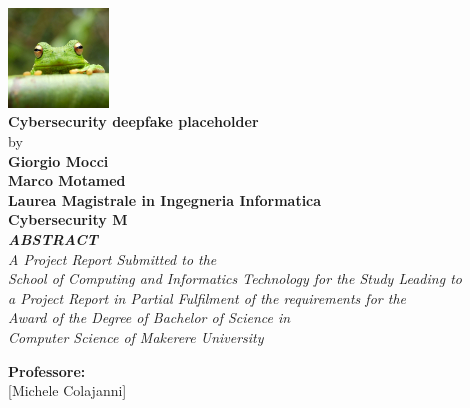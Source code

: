 \begin{titlepage}

\begin{center}

\includegraphics[width=0.2\textwidth]{frog.jpg}\\%
\vspace{3em}%
\Large \textbf {Cybersecurity deepfake placeholder}\\%
\vspace{1em}%
\normalsize by \\%
\vspace{1em}
\textup{\small {\bf Giorgio Mocci \\ Marco Motamed}\\}
 \vspace{1em}%
{\bf Laurea Magistrale in Ingegneria Informatica \\ Cybersecurity M}\\[0.5in]

\emph{\textbf{ABSTRACT} \\  A Project Report Submitted to the \\School of Computing and Informatics Technology
for the Study Leading to\\ a Project Report in Partial Fulfilment of the
requirements for the\\ Award of the Degree of Bachelor of Science in \\Computer Science
of Makerere University}

        \vspace{1in}

       

\normalsize {\bf Professore:} \\

[Michele Colajanni]\\
\vspace{1em}



\end{center}
\end{titlepage}
